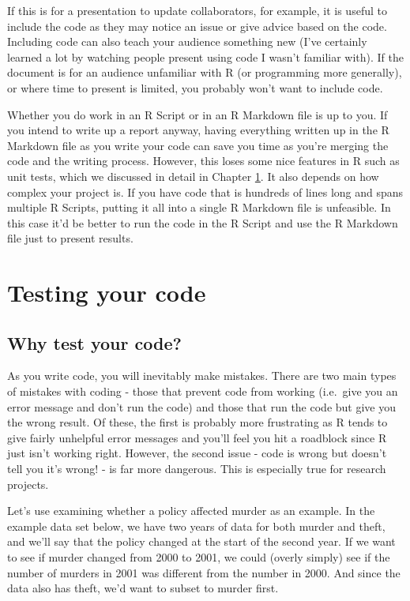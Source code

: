 \documentclass[
  12pt,
  openany]{book}
\begin{document}
If this is for a presentation to update collaborators, for example, it is useful to include the code as they may notice an issue or give advice based on the code. Including code can also teach your audience something new (I've certainly learned a lot by watching people present using code I wasn't familiar with). If the document is for an audience unfamiliar with R (or programming more generally), or where time to present is limited, you probably won't want to include code.

Whether you do work in an R Script or in an R Markdown file is up to you. If you intend to write up a report anyway, having everything written up in the R Markdown file as you write your code can save you time as you're merging the code and the writing process. However, this loses some nice features in R such as unit tests, which we discussed in detail in Chapter \ref{tests}. It also depends on how complex your project is. If you have code that is hundreds of lines long and spans multiple R Scripts, putting it all into a single R Markdown file is unfeasible. In this case it'd be better to run the code in the R Script and use the R Markdown file just to present results.

\hypertarget{tests}{%
\chapter{Testing your code}\label{tests}}

\hypertarget{why-test-your-code}{%
\section{Why test your code?}\label{why-test-your-code}}

As you write code, you will inevitably make mistakes. There are two main types of mistakes with coding - those that prevent code from working (i.e.~give you an error message and don't run the code) and those that run the code but give you the wrong result. Of these, the first is probably more frustrating as R tends to give fairly unhelpful error messages and you'll feel you hit a roadblock since R just isn't working right. However, the second issue - code is wrong but doesn't tell you it's wrong! - is far more dangerous. This is especially true for research projects.

Let's use examining whether a policy affected murder as an example. In the example data set below, we have two years of data for both murder and theft, and we'll say that the policy changed at the start of the second year. If we want to see if murder changed from 2000 to 2001, we could (overly simply) see if the number of murders in 2001 was different from the number in 2000. And since the data also has theft, we'd want to subset to murder first.
\end{document}
